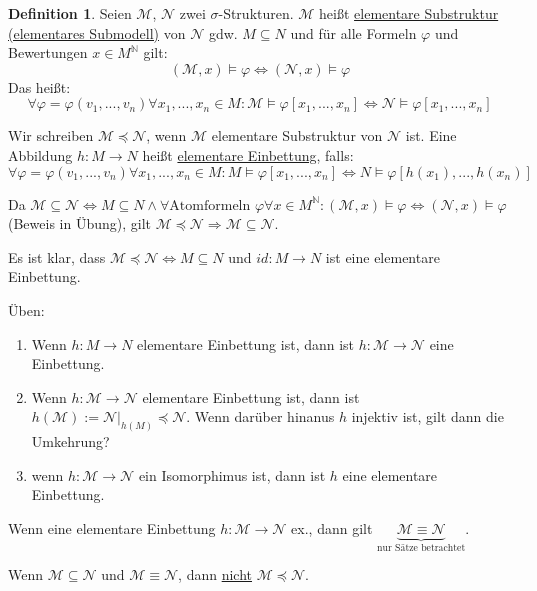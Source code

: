 \documentclass{article}
\theoremstyle{definition}
\newtheorem{dfn}{Definition}[section]
\theoremstyle{plain}
\newcommand{\m}[1]{\mathcal{#1}}
\begin{document}
    \begin{dfn}
        Seien $ \m{M} $, $ \m{N} $ zwei $ \sigma $-Strukturen.
        $ \m{M} $ heißt \underline{elementare Substruktur (elementares Submodell)} von $ \m{N} $ gdw. $ M \subseteq N $ und für alle Formeln $ \varphi $ und Bewertungen $ x \in M^\mathbb{N} $ gilt:
        \begin{equation*}
            (\m{M}, x) \models \varphi \Leftrightarrow (\m{N}, x) \models \varphi
        \end{equation*}
        Das heißt:
        \begin{equation*}
            \forall \varphi = \varphi(v_1, ..., v_n) \forall x_1, ..., x_n \in M: \m{M} \models \varphi[x_1, ..., x_n] \Leftrightarrow \m{N} \models \varphi[x_1, ..., x_n]
        \end{equation*}

        Wir schreiben $ \m{M} \preceq \m{N} $, wenn $ \m{M} $ elementare Substruktur von $ \m{N} $ ist.
        Eine Abbildung $ h : M \rightarrow N $ heißt \underline{elementare Einbettung}, falls:
        \begin{equation*}
            \forall \varphi = \varphi(v_1, ..., v_n) \forall x_1, ..., x_n \in M:
            M \models \varphi[x_1, ..., x_n] \Leftrightarrow N \models \varphi[h(x_1), ..., h(x_n)]
        \end{equation*}

        Da $ \m{M} \subseteq \m{N} \Leftrightarrow M \subseteq N \land \forall \text{Atomformeln } \varphi \forall x \in M^\mathbb{N}: (\m{M}, x) \models \varphi \Leftrightarrow (\m{N}, x) \models \varphi $ (Beweis in Übung), gilt $ \m{M} \preceq \m{N} \Rightarrow \m{M} \subseteq \m{N} $.

        Es ist klar, dass $ \m{M} \preceq \m{N} \Leftrightarrow M \subseteq N $ und $ id: M \rightarrow N $ ist eine elementare Einbettung.

        Üben:
        \begin{enumerate}
            \item Wenn $ h: M \rightarrow N $ elementare Einbettung ist, dann ist $ h : \m{M} \rightarrow \m{N} $ eine Einbettung.

            \item Wenn $ h : \m{M} \rightarrow \m{N} $ elementare Einbettung ist, dann ist $ h(\m{M}) := \m{N} |_{h(M)} \preceq \m{N} $.
            Wenn darüber hinanus $ h $ injektiv ist, gilt dann die Umkehrung?

            \item wenn $ h : \m{M} \rightarrow \m{N} $ ein Isomorphimus ist, dann ist $ h $ eine elementare Einbettung.
        \end{enumerate}

        Wenn eine elementare Einbettung $ h: \m{M} \rightarrow \m{N} $ ex., dann gilt $ \underbrace{\m{M} \equiv \m{N}}_{\text{nur Sätze betrachtet}} $.

        Wenn $ \m{M} \subseteq \m{N} $ und $ \m{M} \equiv \m{N} $, dann \underline{nicht} $ \m{M} \preceq \m{N} $.
    \end{dfn}
\end{document}
